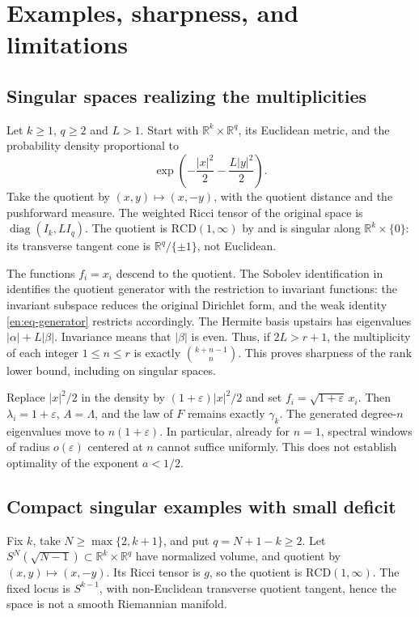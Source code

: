 \documentclass[12pt]{amsart}
\theoremstyle{definition}
\theoremstyle{remark}
\numberwithin{equation}{section}
\newcommand{\R}{\mathbb{R}}
\newcommand{\RCD}{\mathrm{RCD}}
\theoremstyle{jpplain}
\begin{document}
\section{Examples, sharpness, and limitations}

\subsection{Singular spaces realizing the multiplicities}
Let $k\geq1$, $q\geq2$ and $L>1$.  Start with $\R^k\times\R^q$,
its Euclidean metric, and the probability density proportional to
\[
 \exp\left(-\frac{|x|^2}{2}-\frac{L|y|^2}{2}\right).
\]
Take the quotient by $(x,y)\mapsto(x,-y)$, with the quotient distance and
the pushforward measure.  The weighted Ricci tensor of the original
space is $\operatorname{diag}(I_k,LI_q)$.  The quotient is
$\RCD(1,\infty)$ by \cite[Theorem 1.1]{en:GGKMS} and is singular along
$\R^k\times\{0\}$: its transverse tangent cone is
$\R^q/\{\pm1\}$, not Euclidean.

The functions $f_i=x_i$ descend to the quotient.  The Sobolev identification
in \cite[Theorem 5.12]{en:GGKMS} identifies the quotient generator with
the restriction to invariant functions: the invariant subspace reduces
the original Dirichlet form, and the weak identity
\eqref{en:eq-generator} restricts accordingly.  The Hermite basis upstairs
has eigenvalues $|\alpha|+L|\beta|$.  Invariance means that $|\beta|$ is
even.  Thus, if $2L>r+1$, the multiplicity of each integer $1\leq n\leq r$
is exactly $\binom{k+n-1}{n}$.  This proves sharpness of the rank lower
bound, including on singular spaces.

Replace $|x|^2/2$ in the density by $(1+\varepsilon)|x|^2/2$ and set
$f_i=\sqrt{1+\varepsilon}\,x_i$.  Then
$\lambda_i=1+\varepsilon$, $A=\Lambda$, and the law of $F$ remains exactly
$\gamma_k$.  The generated degree-$n$ eigenvalues move to
$n(1+\varepsilon)$.  In particular, already for $n=1$, spectral windows
of radius $o(\varepsilon)$ centered at $n$ cannot suffice uniformly.
This does not establish optimality of the exponent $a<1/2$.

\subsection{Compact singular examples with small deficit}
Fix $k$, take $N\geq\max\{2,k+1\}$, and put $q=N+1-k\geq2$.
Let $S^N(\sqrt{N-1})\subset\R^k\times\R^q$ have normalized volume,
and quotient by $(x,y)\mapsto(x,-y)$.  Its Ricci tensor is $g$, so the
quotient is $\RCD(1,\infty)$.  The fixed locus is $S^{k-1}$, with
non-Euclidean transverse quotient tangent, hence the space is not a
smooth Riemannian manifold.
\end{document}
